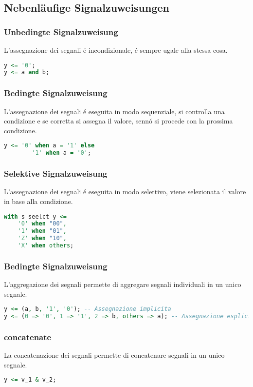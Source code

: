     \subsection{Nebenläufige Signalzuweisungen}
    
        \subsubsection{Unbedingte Signalzuweisung}
            L'assegnazione dei segnali é incondizionale, é sempre ugale alla stessa cosa.
            \begin{lstlisting}[language=VHDL]
y <= '0';
y <= a and b;
            \end{lstlisting}
    
        \subsubsection{Bedingte Signalzuweisung}
            L'assegnazione dei segnali é eseguita in modo sequenziale, si controlla una condizione e se corretta si assegna il valore, sennó si procede con la prossima condizione.
            \begin{lstlisting}[language=VHDL]
y <= '0' when a = '1' else 
        '1' when a = '0';
            \end{lstlisting}
    
        \subsubsection{Selektive Signalzuweisung}
            L'assegnazione dei segnali é eseguita in modo selettivo, viene selezionata il valore in base alla condizione.
            \begin{lstlisting}[language=VHDL]
with s seelct y <=
    '0' when "00",
    '1' when "01",
    'Z' when "10",
    'X' when others;
            \end{lstlisting}
    
        \subsubsection{Bedingte Signalzuweisung}
            L'aggregazione dei segnali permette di aggregare segnali individuali in un unico segnale.
            \begin{lstlisting}[language=VHDL]
y <= (a, b, '1', '0'); -- Assegnazione implicita
y <= (0 => '0', 1 => '1', 2 => b, others => a); -- Assegnazione esplicita (<posizione_vettoriale> => <valore>)
            \end{lstlisting}
    
        \subsubsection{concatenate}
            La concatenazione dei segnali permette di concatenare segnali in un unico segnale.
            \begin{lstlisting}[language=VHDL]
y <= v_1 & v_2;
            \end{lstlisting}